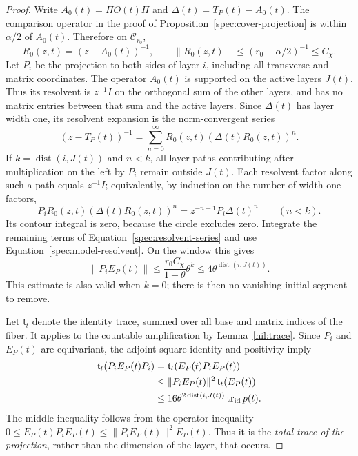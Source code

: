 \begin{proof}
Write $A_0(t)=\Pi O(t)\Pi$ and $\Delta(t)=T_P(t)-A_0(t)$.  The comparison
operator in the proof of Proposition~\ref{spec:cover-projection} is
within $\alpha/2$ of $A_0(t)$.  Therefore on $\mathcal C_{r_0}$,
\begin{equation}
 R_0(z,t)=(z-A_0(t))^{-1},\qquad
       \|R_0(z,t)\|\leq(r_0-\alpha/2)^{-1}\leq C_\chi.
 \label{spec:model-resolvent}
\end{equation}
Let $P_i$ be the projection to both sides of layer $i$, including all
transverse and matrix coordinates.  The operator $A_0(t)$ is supported
on the active layers $J(t)$.  Thus its resolvent is $z^{-1}I$ on the
orthogonal sum of the other layers, and has no matrix entries between
that sum and the active layers.  Since $\Delta(t)$ has layer width one,
its resolvent expansion is the norm-convergent series
\begin{equation}
 (z-T_P(t))^{-1}
       =\sum_{n=0}^\infty R_0(z,t)(\Delta(t)R_0(z,t))^n.
 \label{spec:resolvent-series}
\end{equation}
If $k=\operatorname{dist}(i,J(t))$ and $n<k$, all layer paths contributing
after multiplication on the left by $P_i$ remain outside $J(t)$.  Each
resolvent factor along such a path equals $z^{-1}I$; equivalently,
by induction on the number of width-one factors,
\[
 P_iR_0(z,t)(\Delta(t)R_0(z,t))^n
                   =z^{-n-1}P_i\Delta(t)^n\qquad(n<k).
\]
Its contour integral is zero, because the circle excludes zero.  Integrate
the remaining terms of Equation~\eqref{spec:resolvent-series} and use
Equation~\eqref{spec:model-resolvent}.  On the window this gives
\begin{equation}
     \|P_iE_P(t)\|
       \leq\frac{r_0C_\chi}{1-\theta}\theta^k
       \leq4\theta^{\operatorname{dist}(i,J(t))}.
 \label{spec:layer-norm}
\end{equation}
This estimate is also valid when $k=0$; there is then no vanishing initial
segment to remove.

Let $\mathfrak t_t$ denote the identity trace, summed over all base and
matrix indices of the fiber.  It applies to the countable amplification
by Lemma~\ref{nil:trace}.  Since $P_i$ and $E_P(t)$ are equivariant,
the adjoint-square identity and positivity imply
\begin{align}
 \mathfrak t_t(P_iE_P(t)P_i)
   &=\mathfrak t_t(E_P(t)P_iE_P(t))\notag\\
   &\leq\|P_iE_P(t)\|^2\,\mathfrak t_t(E_P(t))\notag\\
   &\leq16\theta^{2\operatorname{dist}(i,J(t))}
                    \operatorname{tr}_{\mathrm{id}}p(t).
 \label{spec:layer-trace}
\end{align}
The middle inequality follows from the operator inequality
$0\leq E_P(t)P_iE_P(t)\leq\|P_iE_P(t)\|^2E_P(t)$.  Thus it is the
\emph{total trace of the projection}, rather than the dimension of the
layer, that occurs.


\end{proof}
